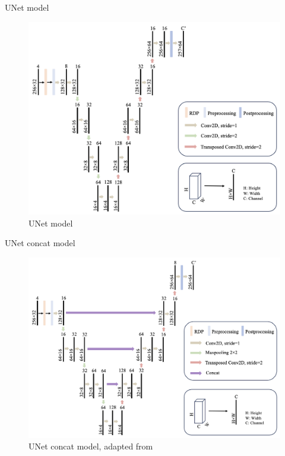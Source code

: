 \documentclass{beamer}
\begin{document}
\begin{frame}[t]{UNet model}

    \begin{figure}
        \centering
        \includegraphics[scale=.46]{MA_presentation/figures/unet_model.png}
        \caption{UNet model}
    \end{figure}

\end{frame}



\begin{frame}[t]{UNet concat model \cite{prabhakara_high_2023}}

    \begin{figure}
        \centering
        \includegraphics[scale=.45]{MA_presentation/figures/unet_concat.png}
        \caption{UNet concat model, adapted from \cite{prabhakara_high_2023}}
    \end{figure}

\end{frame}
\end{document}
